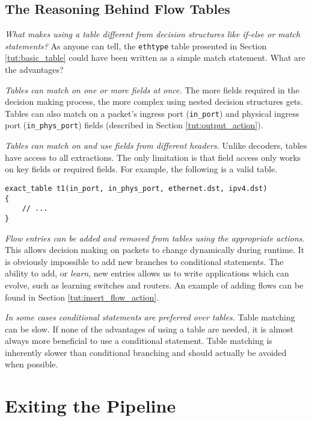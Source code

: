 \subsection{The Reasoning Behind Flow Tables} \label{tut:why_tables}

\textit{What makes using a table different from decision structures like
if-else or match statements?} As anyone can tell, the \texttt{ethtype} table
presented in Section \ref{tut:basic_table} could have been written as a simple
match statement. What are the advantages?

\textit{Tables can match on one or more fields at once.} The more fields
required in the decision making process, the more complex using nested decision
structures gets. Tables can also match on a packet's ingress port
(\texttt{in\_port}) and physical ingress port (\texttt{in\_phys\_port}) fields
(described in Section \ref{tut:output_action}).

\textit{Tables can match on and use fields from different headers.} Unlike
decoders, tables have access to all extractions. The only limitation is that
field access only works on key fields or required fields. For example, the
following is a valid table.

\begin{lstlisting}
exact_table t1(in_port, in_phys_port, ethernet.dst, ipv4.dst)
{
	// ...
}
\end{lstlisting}

\textit{Flow entries can be added and removed from tables using the appropriate
actions.} This allows decision making on packets to change dynamically during
runtime. It is obviously impossible to add new branches to conditional
statements. The ability to add, or \textit{learn}, new entries allows us to
write applications which can evolve, such as learning switches and routers. An
example of adding flows can be found in Section \ref{tut:insert_flow_action}.

\textit{In some cases conditional statements are preferred over tables.} Table matching can be slow. If none of the advantages of using a table are needed, it is almost always more beneficial to use a conditional statement. Table matching is inherently slower than conditional branching and should actually be avoided when possible.

\section{Exiting the Pipeline} \label{tut:pipeline_exit}

